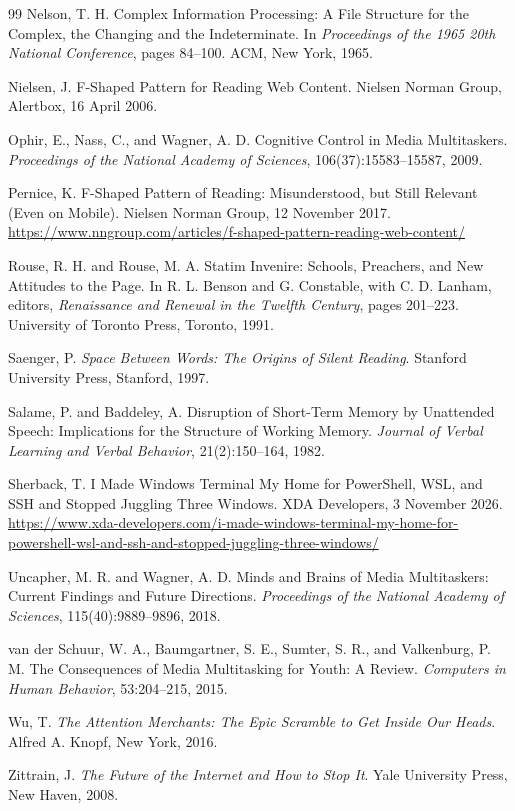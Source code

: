 \documentclass[12pt]{article}
\begin{document}
\begin{thebibliography}{99}
Nelson, T. H. Complex Information Processing: A File Structure for the Complex, the Changing and the Indeterminate. In \emph{Proceedings of the 1965 20th National Conference}, pages 84--100. ACM, New York, 1965.

Nielsen, J. F-Shaped Pattern for Reading Web Content. Nielsen Norman Group, Alertbox, 16 April 2006.

Ophir, E., Nass, C., and Wagner, A. D. Cognitive Control in Media Multitaskers. \emph{Proceedings of the National Academy of Sciences}, 106(37):15583--15587, 2009.

Pernice, K. F-Shaped Pattern of Reading: Misunderstood, but Still Relevant (Even on Mobile). Nielsen Norman Group, 12 November 2017. \url{https://www.nngroup.com/articles/f-shaped-pattern-reading-web-content/}

Rouse, R. H. and Rouse, M. A. Statim Invenire: Schools, Preachers, and New Attitudes to the Page. In R. L. Benson and G. Constable, with C. D. Lanham, editors, \emph{Renaissance and Renewal in the Twelfth Century}, pages 201--223. University of Toronto Press, Toronto, 1991.

Saenger, P. \emph{Space Between Words: The Origins of Silent Reading}. Stanford University Press, Stanford, 1997.

Salame, P. and Baddeley, A. Disruption of Short-Term Memory by Unattended Speech: Implications for the Structure of Working Memory. \emph{Journal of Verbal Learning and Verbal Behavior}, 21(2):150--164, 1982.

Sherback, T. I Made Windows Terminal My Home for PowerShell, WSL, and SSH and Stopped Juggling Three Windows. XDA Developers, 3 November 2026. \url{https://www.xda-developers.com/i-made-windows-terminal-my-home-for-powershell-wsl-and-ssh-and-stopped-juggling-three-windows/}

Uncapher, M. R. and Wagner, A. D. Minds and Brains of Media Multitaskers: Current Findings and Future Directions. \emph{Proceedings of the National Academy of Sciences}, 115(40):9889--9896, 2018.

van der Schuur, W. A., Baumgartner, S. E., Sumter, S. R., and Valkenburg, P. M. The Consequences of Media Multitasking for Youth: A Review. \emph{Computers in Human Behavior}, 53:204--215, 2015.

Wu, T. \emph{The Attention Merchants: The Epic Scramble to Get Inside Our Heads}. Alfred A. Knopf, New York, 2016.

Zittrain, J. \emph{The Future of the Internet and How to Stop It}. Yale University Press, New Haven, 2008.

\end{thebibliography}
\end{document}

